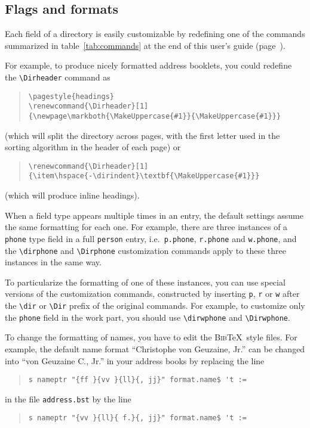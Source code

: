\documentclass[10pt]{article}
\renewcommand{\Dirheader}[1]{\item\hspace{-\dirindent}\textbf{\MakeUppercase{#1}}}
\newcommand{\BibTeX}{\textsc{Bib}\TeX}
\begin{document}
\subsection{Flags and formats}
\label{sec:flagsformats}

Each field of a directory is easily customizable by redefining one of the
commands summarized in table~\ref{tab:commands} at the end of this user's
guide (page~\pageref{tab:commands}).

For example, to produce nicely formatted address booklets, you could
redefine the \verb'\Dirheader' command as
\begin{quote}
\begin{verbatim}
\pagestyle{headings}
\renewcommand{\Dirheader}[1]
{\newpage\markboth{\MakeUppercase{#1}}{\MakeUppercase{#1}}}
\end{verbatim}
\end{quote}
(which will split the directory across pages, with the first letter used in
the sorting algorithm in the header of each page) or
\begin{quote}
\begin{verbatim}
\renewcommand{\Dirheader}[1]
{\item\hspace{-\dirindent}\textbf{\MakeUppercase{#1}}}
\end{verbatim}
\end{quote}
(which will produce inline headings).

When a field type appears multiple times in an entry, the default settings
assume the same formatting for each one. For example, there are three
instances of a \texttt{phone} type field in a full \texttt{person} entry,
i.e.\ \texttt{p.phone}, \texttt{r.phone} and \texttt{w.phone}, and the
\verb'\dirphone' and \verb'\Dirphone' customization commands apply to these
three instances in the same way.

To particularize the formatting of one of these instances, you can use
special versions of the customization commands, constructed by inserting
\texttt{p}, \texttt{r} or \texttt{w} after the \verb'\dir' or \verb'\Dir'
prefix of the original commands. For example, to customize only the
\texttt{phone} field in the work part, you should use \verb'\dirwphone' and
\verb'\Dirwphone'.

To change the formatting of names, you have to edit the \BibTeX\ style
files. For example, the default name format ``Christophe von Geuzaine, Jr.''
can be changed into ``von Geuzaine C., Jr.'' in your address books by replacing the line
\begin{quote}
\begin{verbatim}
s nameptr "{ff }{vv }{ll}{, jj}" format.name$ 't :=
\end{verbatim}
\end{quote}
in the file \texttt{address.bst} by the line
\begin{quote}
\begin{verbatim}
s nameptr "{vv }{ll}{ f.}{, jj}" format.name$ 't :=
\end{verbatim}
\end{quote}
\end{document}
